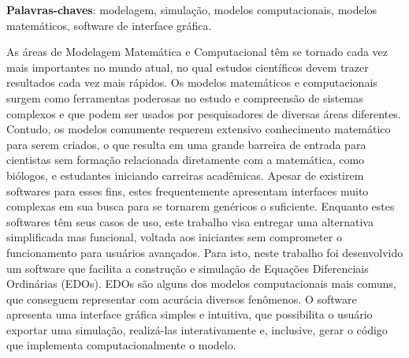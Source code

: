 \begin{resumo}
	
	
	\vspace{\onelineskip}
	
	\noindent
	\textbf{Palavras-chaves}: modelagem, simulação, modelos computacionais, modelos matemáticos, software de interface gráfica.
	
	As áreas de Modelagem Matemática e Computacional têm se tornado cada vez mais importantes no mundo atual, no qual estudos científicos devem trazer resultados cada vez mais rápidos. Os modelos matemáticos e computacionais surgem como ferramentas poderosas no estudo e compreensão de sistemas complexos e que podem ser usados por pesquisadores de diversas áreas diferentes. Contudo, os modelos comumente requerem extensivo conhecimento matemático para serem criados, o que resulta em uma grande barreira de entrada para cientistas sem formação relacionada diretamente com a matemática, como biólogos, e estudantes iniciando carreiras acadêmicas. Apesar de existirem softwares para esses fins, estes frequentemente apresentam interfaces muito complexas em sua busca para se tornarem genéricos o suficiente. Enquanto estes softwares têm seus casos de uso, este trabalho visa entregar uma alternativa simplificada mas funcional, voltada aos iniciantes sem comprometer o funcionamento para usuários avançados. Para isto, neste trabalho foi desenvolvido um software que facilita a construção e simulação de Equações Diferenciais Ordinárias (EDOs).  EDOs são alguns dos modelos computacionais mais comuns, que conseguem representar com acurácia diversos fenômenos. O software apresenta uma interface gráfica simples e intuitiva, que possibilita o usuário exportar uma simulação, realizá-las interativamente e, inclusive, gerar o código que implementa computacionalmente o modelo.

\end{resumo}

